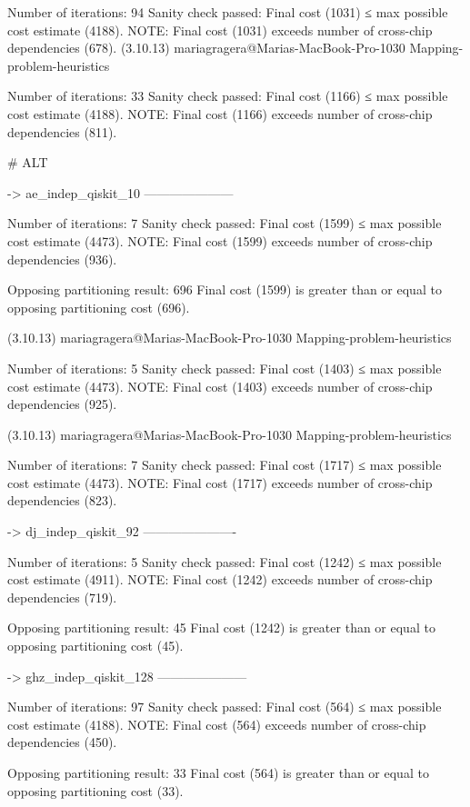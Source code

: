 Number of iterations: 94
Sanity check passed: Final cost (1031) ≤ max possible cost estimate (4188).
NOTE: Final cost (1031) exceeds number of cross-chip dependencies (678).
(3.10.13) mariagragera@Marias-MacBook-Pro-1030 Mapping-problem-heuristics %

Number of iterations: 33
Sanity check passed: Final cost (1166) ≤ max possible cost estimate (4188).
NOTE: Final cost (1166) exceeds number of cross-chip dependencies (811).

# ALT

-> ae_indep_qiskit_10
---------------------

Number of iterations: 7
Sanity check passed: Final cost (1599) ≤ max possible cost estimate (4473).
NOTE: Final cost (1599) exceeds number of cross-chip dependencies (936).

Opposing partitioning result: 696
Final cost (1599) is greater than or equal to opposing partitioning cost (696).

(3.10.13) mariagragera@Marias-MacBook-Pro-1030 Mapping-problem-heuristics %

Number of iterations: 5
Sanity check passed: Final cost (1403) ≤ max possible cost estimate (4473).
NOTE: Final cost (1403) exceeds number of cross-chip dependencies (925).

(3.10.13) mariagragera@Marias-MacBook-Pro-1030 Mapping-problem-heuristics %

Number of iterations: 7
Sanity check passed: Final cost (1717) ≤ max possible cost estimate (4473).
NOTE: Final cost (1717) exceeds number of cross-chip dependencies (823).

-> dj_indep_qiskit_92
----------------------

Number of iterations: 5
Sanity check passed: Final cost (1242) ≤ max possible cost estimate (4911).
NOTE: Final cost (1242) exceeds number of cross-chip dependencies (719).

Opposing partitioning result: 45
Final cost (1242) is greater than or equal to opposing partitioning cost (45).

-> ghz_indep_qiskit_128
---------------------

Number of iterations: 97
Sanity check passed: Final cost (564) ≤ max possible cost estimate (4188).
NOTE: Final cost (564) exceeds number of cross-chip dependencies (450).

Opposing partitioning result: 33
Final cost (564) is greater than or equal to opposing partitioning cost (33).